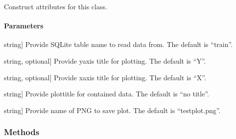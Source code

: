 \documentclass[letterpaper,10pt,english]{sphinxmanual}
\begin{document}
\begin{fulllineitems}
\begin{fulllineitems}
\label{\detokenize{_autosummary/functionfinder.classes.testdata:functionfinder.classes.testdata.__init__}}
\pysigstartsignatures
{}
\pysigstopsignatures
\sphinxAtStartPar
Construct attributes for this class.


\paragraph{Parameters}
\label{\detokenize{_autosummary/functionfinder.classes.testdata:parameters}}\begin{description}
\sphinxlineitem{dataname}{[}string{]}
\sphinxAtStartPar
Provide SQLite table name to read data from.
The default is “train”.

\sphinxlineitem{ylabel}{[}string, optional{]}
\sphinxAtStartPar
Provide y\sphinxhyphen{}axis title for plotting. The default is “Y”.

\sphinxlineitem{xlabel}{[}string, optional{]}
\sphinxAtStartPar
Provide x\sphinxhyphen{}axis title for plotting. The default is “X”.

\sphinxlineitem{plottitle}{[}string{]}
\sphinxAtStartPar
Provide plot\sphinxhyphen{}title for contained data. The default is “no title”.

\sphinxlineitem{plotfile}{[}string{]}
\sphinxAtStartPar
Provide name of PNG to save plot. The default is “testplot.png”.

\end{description}

\end{fulllineitems}

\subsubsection*{Methods}



\end{fulllineitems}
\end{document}

